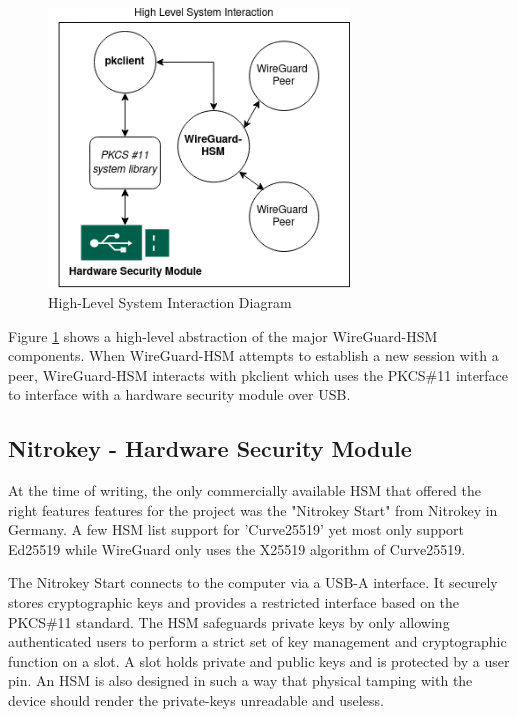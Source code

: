 \documentclass [11pt, proquest] {uwthesis}[2020/02/24]
\begin{document}
\begin{figure}[ht]
\begin{center}
\includegraphics[width=8cm]{paper/images/high-level-overview.png}
\caption{High-Level System Interaction Diagram}
\label{fig:highlevel_system}
\end{center}
\end{figure}

Figure \ref{fig:highlevel_system} shows a high-level abstraction of the major WireGuard-HSM components. When WireGuard-HSM attempts to establish a new session with a peer, WireGuard-HSM interacts with pkclient which uses the PKCS\#11 interface to interface with a hardware security module over USB. 

\subsection{Nitrokey - Hardware Security Module}

At the time of writing, the only commercially available HSM that offered the right features features for the project was the "Nitrokey Start" from Nitrokey in Germany\cite{noauthor_nitrokey_2022}. A few HSM list support for 'Curve25519' yet most only support Ed25519 while WireGuard only uses the X25519 algorithm of Curve25519.

The Nitrokey Start connects to the computer via a USB-A interface. It securely stores cryptographic keys and provides a restricted interface based on the PKCS\#11 standard.
The HSM safeguards private keys by only allowing authenticated users to perform a strict set of key management and cryptographic function on a slot. A slot holds private and public keys and is protected by a user pin. An HSM is also designed in such a way that physical tamping with the device should render the private-keys unreadable and useless. 
\end{document}
